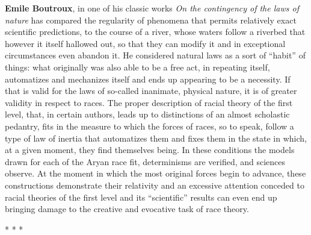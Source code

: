 \textbf{Emile Boutroux}, in one of his classic works \textit{On the contingency of the laws of nature} has compared the regularity of phenomena that permits relatively exact scientific predictions, to the course of a river, whose waters follow a riverbed that however it itself hallowed out, so that they can modify it and in exceptional circumstances even abandon it. He considered natural laws as a sort of ``habit'' of things: what originally was also able to be a free act, in repeating itself, automatizes and mechanizes itself and ends up appearing to be a necessity. If that is valid for the laws of so-called inanimate, physical nature, it is of greater validity in respect to races. The proper description of racial theory of the first level, that, in certain authors, leads up to distinctions of an almost scholastic pedantry, fits in the measure to which the forces of races, so to speak, follow a type of law of inertia that automatizes them and fixes them in the state in which, at a given moment, they find themselves being. In these conditions the models drawn for each of the Aryan race fit, determinisms are verified, and sciences observe. At the moment in which the most original forces begin to advance, these constructions demonstrate their relativity and an excessive attention conceded to racial theories of the first level and its ``scientific'' results can even end up bringing damage to the creative and evocative task of race theory.



\begin{center}* * *\end{center}

